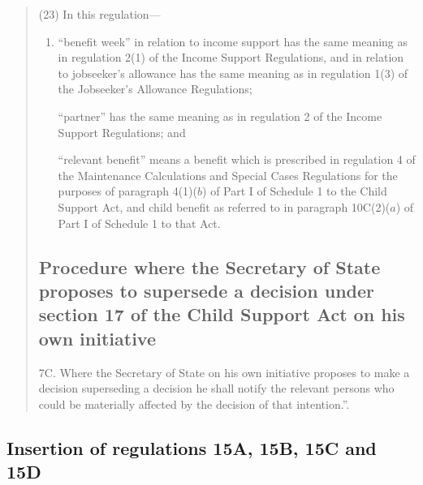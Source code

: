 \documentclass[12pt,a4paper]{article}
\begin{document}
\begin{quotation}
(23) In this regulation—
\begin{enumerate}\item[]
    “benefit week” in relation to income support has the same meaning as in regulation 2(1) of the Income Support Regulations, and in relation to jobseeker’s allowance has the same meaning as in regulation 1(3) of the Jobseeker’s Allowance Regulations;

    “partner” has the same meaning as in regulation 2 of the Income Support Regulations; and

    “relevant benefit” means a benefit which is prescribed in regulation 4 of the Maintenance Calculations and Special Cases Regulations for the purposes of paragraph 4(1)($b$)  of Part I of Schedule 1 to the Child Support Act, and child benefit as referred to in paragraph 10C(2)($a$)  of Part I of Schedule 1 to that Act. 
\end{enumerate}

\subsection*{Procedure where the Secretary of State proposes to supersede a decision under section 17 of the Child Support Act on his own initiative}

7C.  Where the Secretary of State on his own initiative proposes to make a decision superseding a decision he shall notify the relevant persons who could be materially affected by the decision of that intention.”.
\end{quotation}

\subsection[10. Insertion of regulations 15A, 15B, 15C and 15D]{Insertion of regulations 15A, 15B, 15C and 15D}
\end{document}

